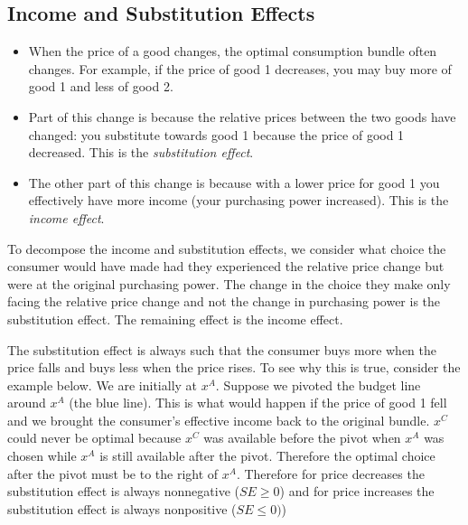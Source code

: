 \documentclass{article}
\begin{document}
\subsection*{Income and Substitution Effects}
\begin{itemize}
  \item When the price of a good changes, the optimal consumption bundle often changes. For example, if the price of good 1 decreases, you may buy more of good 1 and less of good 2.
  \item Part of this change is because the relative prices between the two goods have changed: you substitute towards good 1 because the price of good 1 decreased. This is the \emph{substitution effect}.
  \item The other part of this change is because with a lower price for good 1 you effectively have more income (your purchasing power increased). This is the \emph{income effect}.
\end{itemize}
To decompose the income and substitution effects, we consider what choice the consumer would have made had they experienced the relative price change but were at the original purchasing power. The change in the choice they make only facing the relative price change and not the change in purchasing power is the substitution effect. The remaining effect is the income effect.

The substitution effect is always such that the consumer buys more when the price falls and buys less when the price rises. To see why this is true, consider the example below. We are initially at $x^A$. Suppose we pivoted the budget line around $x^A$ (the blue line). This is what would happen if the price of good 1 fell and we brought the consumer's effective income back to the original bundle.  $x^C$ could never be optimal because $x^C$ was available before the pivot when $x^A$ was chosen while $x^A$ is still available after the pivot. Therefore the optimal choice after the pivot must be to the right of $x^A$. Therefore for price decreases the substitution effect is always nonnegative ($SE\geq 0$) and for price increases the substitution effect is always nonpositive ($SE\leq 0)$)

\end{document}
